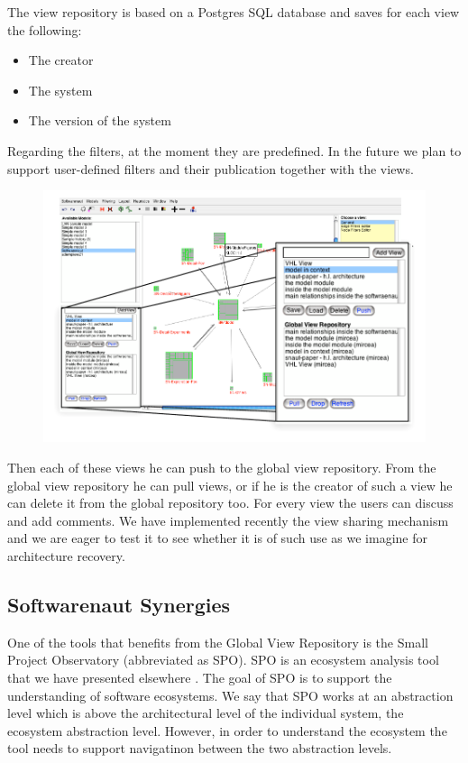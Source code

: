 \documentclass[preprint,12pt]{elsarticle}
\begin{document}
The view repository is based on a Postgres SQL database and saves for each view the following:

\begin{itemize}
\item The creator
\item The system 
\item The version of the system 
\end{itemize}

Regarding the filters, at the moment they are predefined. In the future we plan to support user-defined filters and their publication together with the views. 


\begin{figure}[h]
\begin{center}
\includegraphics[width=0.8\linewidth]{images/ViewOperations.pdf}
\caption{}
\end{center}
\end{figure}



Then each of these views he can push to the global view repository. From the global view repository he can pull views, or if he is the creator of such a view he can delete it from the global repository too. For every view the users can discuss and add comments. We have implemented recently the view sharing mechanism and we are eager to test it to see whether it is of such use as we imagine for architecture recovery. 

\subsection {Softwarenaut Synergies}
One of the tools that benefits from the Global View Repository is the Small Project Observatory (abbreviated as SPO). SPO is an ecosystem analysis tool that we have presented elsewhere \cite{lungu-spo}. The goal of SPO is to support the understanding of software ecosystems. We say that SPO works at an abstraction level which is above the architectural level of the individual system, the ecosystem abstraction level. However, in order to understand the  ecosystem the tool needs to support navigatinon between the two abstraction levels. 
\end{document}
